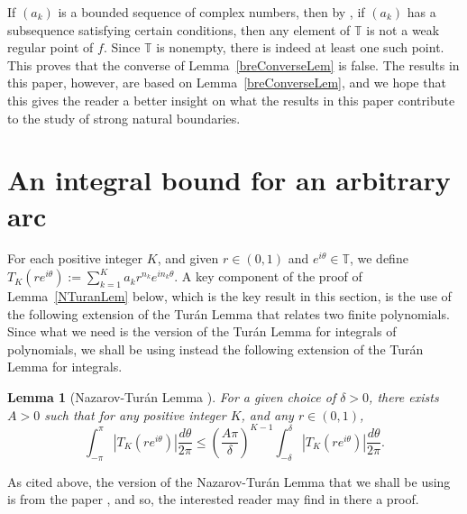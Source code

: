 \documentclass[11pt,a4paper]{article}
\newcommand{\T}{\mathbb{T}}
\newtheorem{lemma}[theorem]{Lemma}
\begin{document}
If $(a_k)$ is a bounded sequence of complex numbers, then by \cite[Theorem~1.6]{bre11}, if $(a_k)$ has a subsequence satisfying certain conditions, then any element of $\T$ is not a weak regular point of $f$. Since $\T$ is nonempty, there is indeed at least one such point. This proves that the converse of Lemma~\ref{breConverseLem} is false. The results in this paper, however, are based on Lemma~\ref{breConverseLem}, and we hope that this gives the reader a better insight on what the results in this paper contribute to the study of strong natural boundaries.

\section{An integral bound for an arbitrary arc}\label{TuranSec}

For each positive integer $K$, and given $r\in(0,1)$ and $e^{i\theta}\in\T$, we define $T_{K}(re^{i\theta}):=\sum_{k=1}^K a_kr^{n_k}e^{in_k\theta}$. A key component of the proof of Lemma~\ref{NTuranLem} below, which is the key result in this section, is the use of the following extension of the Tur\'an Lemma \cite[Corollary~18.5.VI]{tur84} that relates two finite polynomials. Since what we need is the version of the Tur\'an Lemma for integrals of polynomials, we shall be using instead the following extension of the Tur\'an Lemma for integrals.

\begin{lemma}[Nazarov-Tur\'an Lemma {\cite[Section~3]{naz00}}]\label{TuranLem} For a given choice of $\delta>0$, there exists $A>0$ such that for any positive integer $K$, and any $r\in(0,1)$,
\begin{equation}
\int_{-\pi}^{\pi} |T_{K}(re^{i\theta})| \frac{d\theta}{2\pi} \le \left(\frac{A\pi}{\delta}\right)^{K-1} \int_{-\delta}^{\delta} |T_{K}(re^{i\theta})| \frac{d\theta}{2\pi}.
\end{equation}
\end{lemma}

As cited above, the version of the Nazarov-Tur\'an Lemma that we shall be using is from the paper \cite{naz00}, and so, the interested reader may find in there a proof.
\end{document}
